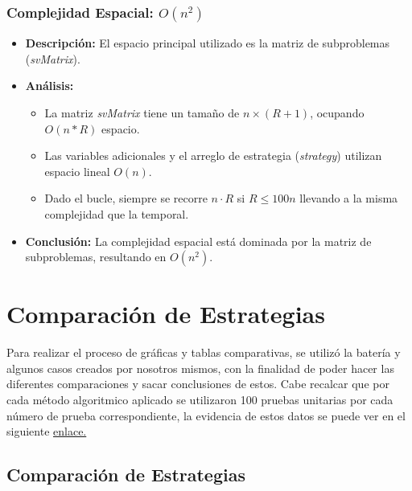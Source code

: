 \documentclass[letterpaper,10pt]{article}
\begin{document}
\subsubsection{Complejidad Espacial: $O(n^2)$}
\begin{itemize}
    \item \textbf{Descripción:} El espacio principal utilizado es la matriz de subproblemas (\textit{svMatrix}).
    
    \item \textbf{Análisis:}
    \begin{itemize}
        \item La matriz \textit{svMatrix} tiene un tamaño de \(n \times (R + 1)\), ocupando \(O(n * R)\) espacio.
        \item Las variables adicionales y el arreglo de estrategia (\textit{strategy}) utilizan espacio lineal \(O(n)\).
        \item Dado el bucle, siempre se recorre $n\cdot R$ si $R\leqslant 100n$ llevando a la misma complejidad que la temporal.
      \end{itemize}
    
    \item \textbf{Conclusión:} La complejidad espacial está dominada por la matriz de subproblemas, resultando en \(O(n^2)\).
\end{itemize}
\label{subsec:complejidad_programacion_dinamica}
\section{Comparación de Estrategias}
\label{sec:comparacion_estrategias}

Para realizar el proceso de gráficas y tablas comparativas, se utilizó la batería y algunos casos creados por nosotros mismos, con la finalidad de poder hacer las diferentes comparaciones y sacar conclusiones de estos. Cabe recalcar que por cada método algoritmico aplicado se utilizaron 100 pruebas unitarias por cada número de prueba correspondiente, la evidencia de estos datos se puede ver en el siguiente \href{https://1drv.ms/x/s!Au19Z890RbcYgYp-EkAe5e8Z_uKeHA?e=RUO2BH}{enlace.}

\subsection{Comparación de Estrategias}
\end{document}
